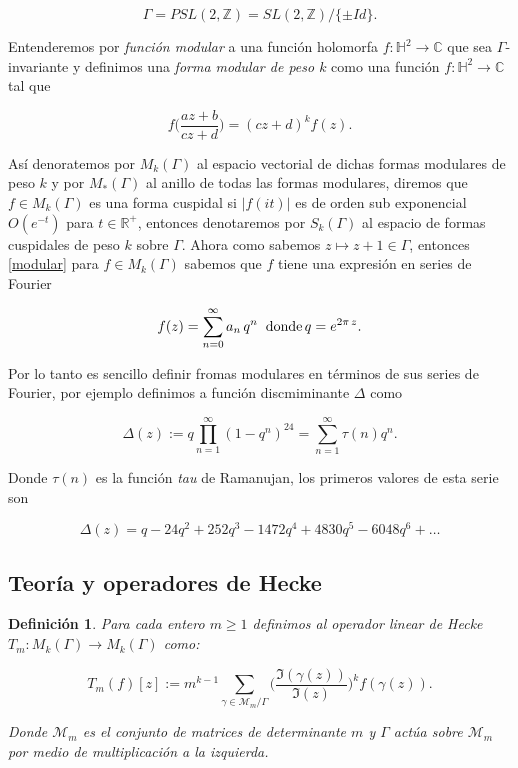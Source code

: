 \documentclass[letterpaper]{report}
\newtheorem{def.}{Definici\'on}[chapter]
\newcommand{\dbz}{\ensuremath{ \mathbb Z }}
\newcommand{\co}{\ensuremath{\mathbb C }}
\newcommand{\re}{\ensuremath{\mathbb R }}
\newcommand{\hd}{\ensuremath{\mathbb{H}^{2}}}
\newcommand{\ga}{\ensuremath{\Gamma}}
\newcommand{\pslz}{\ensuremath{PSL(2,\mathbb Z) }}
\newcommand{\modk}{\ensuremath{M_k(\Gamma)}}
\begin{document}
$$\ga = \pslz = SL(2,\dbz)/\lbrace\pm Id\rbrace.$$ 

Entenderemos por \textit{función modular} a una función holomorfa $f:\hd\rightarrow\co$ que sea $\ga$-invariante y definimos una \textit{forma modular de peso $k$} como una función $f:\hd\rightarrow\co$ tal que

\begin{equation}\label{modular}
f\Big(\frac{az+b}{cz+d}\Big) = (cz+d)^{k}f(z).
\end{equation}

Así denoratemos por $M_k(\ga)$ al espacio vectorial de dichas formas modulares de peso $k$ y por $M_{\ast}(\ga)$ al anillo de todas las formas modulares, diremos que $f\in\modk$ es una forma cuspidal si $\vert f(it)\vert$ es de orden sub exponencial $O(e^{-t})$ para $t\in\re^{+}$, entonces denotaremos por $S_k(\ga)$ al espacio de formas cuspidales de peso $k$ sobre $\ga$. Ahora como sabemos $z\mapsto z+1\in\ga$, entonces \ref{modular} para $f\in\modk$ sabemos que $f$ tiene una expresión en series de Fourier

\begin{equation}
f(z) = \sum_{n=0}^{\infty}a_n\,q^n\hspace{0.2cm}\textrm{donde}\,q=e^{2\pi\,z}.
\end{equation}

Por lo tanto es sencillo definir fromas modulares en términos de sus series de Fourier, por ejemplo definimos a función discmiminante $\Delta$ como

\begin{equation}
\Delta(z):=q \prod_{n=1}^{\infty}(1-q^n)^{24}=\sum_{n=1}^{\infty}\tau(n)q^n.
\end{equation} 

Donde $\tau(n)$ es la función \textit{tau} de Ramanujan, los primeros valores de esta serie son

$$
\Delta(z)=q-24q^2+252q^3-1472q^4+4830q^5-6048 q^6+\ldots
$$

\subsection{Teoría y operadores de Hecke}

\begin{def.}
Para cada entero $m\geq 1$ definimos al operador linear de Hecke $T_m:\modk\rightarrow\modk$ como:

\begin{equation}
T_m(f)[z]:=m^{k-1}\sum_{\gamma\in\mathcal{M}_m/\ga}\Big(\frac{\Im(\gamma(z))}{\Im(z)}\Big)^k f(\gamma(z)).
\end{equation} 

Donde $\mathcal{M}_m$ es el conjunto de matrices de determinante $m$ y $\ga$ actúa sobre $\mathcal{M}_m$ por medio de multiplicación a la izquierda.
\end{def.}
\end{document}
